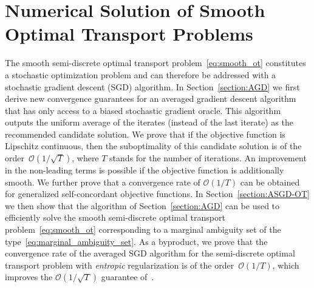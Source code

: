 \documentclass[11pt, a4paper, oneside, reqno]{article}
\begin{document}
    \section{Numerical Solution of Smooth Optimal Transport Problems}
    \label{sec:computation}
	The smooth semi-discrete optimal transport problem~\eqref{eq:smooth_ot} constitutes a stochastic optimization problem and can therefore be addressed with a stochastic gradient descent (SGD) algorithm. In Section~\ref{section:AGD} we first derive new convergence guarantees for an averaged gradient descent algorithm that has only access to a biased stochastic gradient oracle. This algorithm outputs the uniform average of the iterates (instead of the last iterate) as the recommended candidate solution. We prove that if the objective function is Lipschitz continuous, then the suboptimality of this candidate solution is of the order~$\mathcal O(1/\sqrt{T})$, where $T$ stands for the number of iterations. An improvement in the non-leading terms is possible if the objective function is additionally smooth. We further prove that a convergence rate of $\mathcal O(1/{T})$ can be obtained for generalized self-concordant objective functions. In Section~\ref{section:ASGD-OT} we then show that the algorithm of Section~\ref{section:AGD} can be used to efficiently solve the smooth semi-discrete optimal transport problem~\eqref{eq:smooth_ot} corresponding to a marginal ambiguity set of the type~\eqref{eq:marginal_ambiguity_set}. As a byproduct, we prove that the convergence rate of the averaged SGD algorithm for the semi-discrete optimal transport problem with {\em entropic} regularization is of the order~$\mathcal O(1/T)$, which improves the $\mathcal O(1/\sqrt{T})$ guarantee of~\citet{genevay2016stochastic}.
	
	
\end{document}

